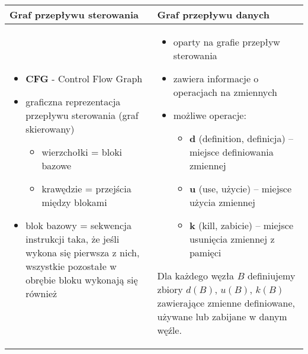 \documentclass[../main.tex]{subfiles}
\begin{document}
    \begin{table}[H]
        \begin{center}
            \begin{tabular}{p{8cm} | p{8cm}}
                \textbf{Graf przepływu sterowania} & \textbf{Graf przepływu danych} \\
                \hline
                \hline
                \begin{itemize}
                    \item \textbf{CFG} - Control Flow Graph
                    \item graficzna reprezentacja przepływu sterowania (graf skierowany)
                    \begin{itemize}
                        \item wierzchołki = bloki bazowe
                        \item krawędzie = przejścia między blokami
                    \end{itemize}
                    \item blok bazowy = sekwencja instrukcji taka, że jeśli wykona się
                    pierwsza z nich, wszystkie pozostałe w obrębie bloku wykonają się również
                \end{itemize}
                &
                \begin{itemize}
                    \item oparty na grafie przepływ sterowania
                    \item zawiera informacje o operacjach na zmiennych
                    \item możliwe operacje:
                    \begin{itemize}
                        \item \textbf{d} (definition, definicja) – miejsce definiowania zmiennej
                        \item \textbf{u} (use, użycie) – miejsce użycia zmiennej
                        \item \textbf{k} (kill, zabicie) – miejsce usunięcia zmiennej z pamięci
                    \end{itemize}
                \end{itemize}

                Dla każdego węzła $B$ definiujemy zbiory $d(B)$, $u(B)$, $k(B)$ zawierające zmienne definiowane, używane lub
                zabijane w danym węźle.
                \\
            \end{tabular}
        \end{center}
    \end{table}
\end{document}
